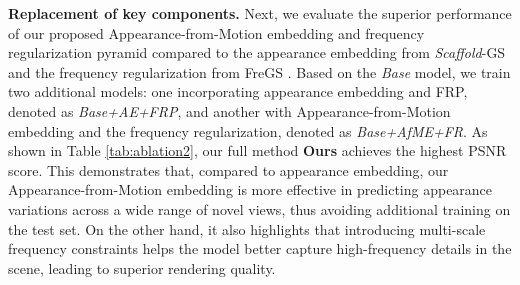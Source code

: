 \noindent\textbf{Replacement of key components.} Next, we evaluate the superior performance of our proposed Appearance-from-Motion embedding and frequency regularization pyramid compared to the appearance embedding from \textit{Scaffold}-GS \cite{Scaffold-GS2024} and the frequency regularization from FreGS \cite{FreGS2024}. Based on the \textit{Base} model, we train two additional models: one incorporating appearance embedding and FRP, denoted as \textit{Base+AE+FRP}, and another with Appearance-from-Motion embedding and the frequency regularization, denoted as \textit{Base+AfME+FR}. As shown in Table \ref{tab:ablation2}, our full method \textbf{Ours} achieves the highest PSNR score. This demonstrates that, compared to appearance embedding, our Appearance-from-Motion embedding is more effective in predicting appearance variations across a wide range of novel views, thus avoiding additional training on the test set. On the other hand, it also highlights that introducing multi-scale frequency constraints helps the model better capture high-frequency details in the scene, leading to superior rendering quality.


